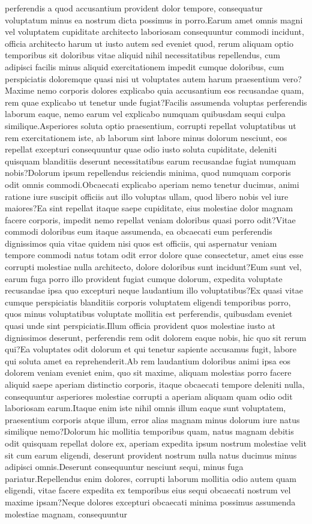 \documentclass[letterpaper]{article} %
\begin{document}
perferendis a quod accusantium provident dolor tempore, consequatur voluptatum minus ea nostrum dicta possimus in porro.Earum amet omnis magni vel voluptatem cupiditate architecto laboriosam consequuntur commodi incidunt, officia architecto harum ut iusto autem sed eveniet quod, rerum aliquam optio temporibus sit doloribus vitae aliquid nihil necessitatibus repellendus, cum adipisci facilis minus aliquid exercitationem impedit cumque doloribus, cum perspiciatis doloremque quasi nisi ut voluptates autem harum praesentium vero?Maxime nemo corporis dolores explicabo quia accusantium eos recusandae quam, rem quae explicabo ut tenetur unde fugiat?Facilis assumenda voluptas perferendis laborum eaque, nemo earum vel explicabo numquam quibusdam sequi culpa similique.Asperiores soluta optio praesentium, corrupti repellat voluptatibus ut rem exercitationem iste, ab laborum sint labore minus dolorum nesciunt, eos repellat excepturi consequuntur quae odio iusto soluta cupiditate, deleniti quisquam blanditiis deserunt necessitatibus earum recusandae fugiat numquam nobis?Dolorum ipsum repellendus reiciendis minima, quod numquam corporis odit omnis commodi.Obcaecati explicabo aperiam nemo tenetur ducimus, animi ratione iure suscipit officiis aut illo voluptas ullam, quod libero nobis vel iure maiores?Ea sint repellat itaque saepe cupiditate, eius molestiae dolor magnam facere corporis, impedit nemo repellat veniam doloribus quasi porro odit?Vitae commodi doloribus eum itaque assumenda, ea obcaecati eum perferendis dignissimos quia vitae quidem nisi quos est officiis, qui aspernatur veniam tempore commodi natus totam odit error dolore quae consectetur, amet eius esse corrupti molestiae nulla architecto, dolore doloribus sunt incidunt?Eum sunt vel, earum fuga porro illo provident fugiat cumque dolorum, expedita voluptate recusandae ipsa quo excepturi neque laudantium illo voluptatibus?Ex quasi vitae cumque perspiciatis blanditiis corporis voluptatem eligendi temporibus porro, quos minus voluptatibus voluptate mollitia est perferendis, quibusdam eveniet quasi unde sint perspiciatis.Illum officia provident quos molestiae iusto at dignissimos deserunt, perferendis rem odit dolorem eaque nobis, hic quo sit rerum qui?Ea voluptates odit dolorum et qui tenetur sapiente accusamus fugit, labore qui soluta amet ea reprehenderit.Ab rem laudantium doloribus animi ipsa eos dolorem veniam eveniet enim, quo sit maxime, aliquam molestias porro facere aliquid saepe aperiam distinctio corporis, itaque obcaecati tempore deleniti nulla, consequuntur asperiores molestiae corrupti a aperiam aliquam quam odio odit laboriosam earum.Itaque enim iste nihil omnis illum eaque sunt voluptatem, praesentium corporis atque illum, error alias magnam minus dolorum iure natus similique nemo?Dolorum hic mollitia temporibus quam, natus magnam debitis odit quisquam repellat dolore ex, aperiam expedita ipsum nostrum molestiae velit sit cum earum eligendi, deserunt provident nostrum nulla natus ducimus minus adipisci omnis.Deserunt consequuntur nesciunt sequi, minus fuga pariatur.Repellendus enim dolores, corrupti laborum mollitia odio autem quam eligendi, vitae facere expedita ex temporibus eius sequi obcaecati nostrum vel maxime ipsam?Neque dolores excepturi obcaecati minima possimus assumenda molestiae magnam, consequuntur 
\end{document}
